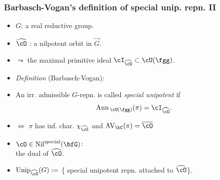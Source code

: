 \documentclass[t,serif,11pt,handout,usenames,dvipsnames]{beamer}
\theoremstyle{plain}
\theoremstyle{definition}
\newcommand{\AV}{\mathrm{AV}}
\def\Ann{{\mathrm{Ann}\,}}
\def\Unip{{\mathrm{Unip}}}
\def\vG{{\overrightarrow{G}}}
\def\ckcO{{\check{\cO}}}
\def\Nil{\mathrm{Nil}}
\def\blue{\color{blue}}
\let\oldemph\emph
\def\emph#1{\oldemph{\blue #1}}
\def\ckcO{\widehat{\cO}}
\begin{document}
    \begin{frame}
      \frametitle{Barbasch-Vogan's definition of  special unip. repn. II}
      \begin{itemize}[<+->]
            \item[] $G$: a real reductive group.
            \item  $\ckcO$ : a nilpotent orbit in $\vG$.
              \vspace{-1.5em}
            \item[] \hspace{1em} $\leadsto$  the maximal primitive ideal
            $\cI_{\ckcO}\subset \cU(\fgg)$. %
              \vspace{-1.5em}
            \item  \emph{Definition} (Barbasch-Vogan):
            \item [] An irr. admissible $G$-repn. is called
            \emph{special unipotent} if
            \[
            \Ann_{\cU(\fgg)}(\pi) = \cI_{\ckcO}.
            \]
            \item[]
            $\Longleftrightarrow$ $\pi$ has inf. char. $\chi_{\ckcO}$ and
            $\AV_\bC(\pi) = \overline{\cO}$
            \item $\cO\in \Nil^{\text{special}}(\bfG)$:\\
            the 
            dual of $\ckcO$.
            \item $\Unip_{\ckcO}(G):=$ \{ special unipotent repn. attached to $\ckcO$\}.
      \end{itemize}
    \end{frame}
\end{document}
